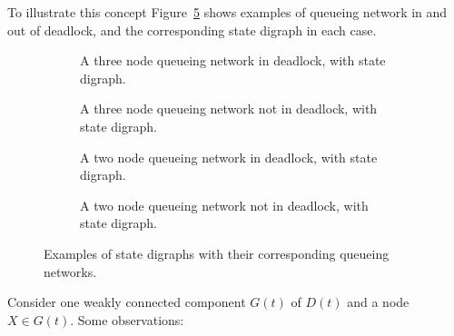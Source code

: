 \documentclass{article}
\numberwithin{equation}{section}
\begin{document}
To illustrate this concept Figure~\ref{fig:exampledigraphs} shows examples of queueing network in and out of deadlock, and the corresponding state digraph in each case.

\begin{figure}[!htbp]
\begin{center}
  \begin{subfigure}{0.45\textwidth}
    \begin{center}
      
    \end{center}
    \caption{A three node queueing network in deadlock, with state digraph.}
    \label{fig:exampledigraph_deadlock}
  \end{subfigure}
  \hspace{6 mm}
  \begin{subfigure}{0.45\textwidth}
    \begin{center}
      
    \end{center}
    \caption{A three node queueing network not in deadlock, with state digraph.}
    \label{fig:exampledigraph_nodeadlock}
    \vspace{6 mm}
  \end{subfigure}
  \begin{subfigure}{0.45\textwidth}
    \begin{center}
      
    \end{center}
    \caption{A two node queueing network in deadlock, with state digraph.}
    \label{fig:exampledigraph_nodeadlock}
  \end{subfigure}
  \hspace{6 mm}
  \begin{subfigure}{0.45\textwidth}
    \begin{center}
      
    \end{center}
    \caption{A two node queueing network not in deadlock, with state digraph.}
    \label{fig:exampledigraph_nodeadlock}
    \vspace{6 mm}
  \end{subfigure}
  \end{center}
  \caption{Examples of state digraphs with their corresponding queueing networks.}
  \label{fig:exampledigraphs}
\end{figure}

Consider one weakly connected component $G(t)$ of $D(t)$ and a node $X \in G(t)$. Some observations:
\end{document}
